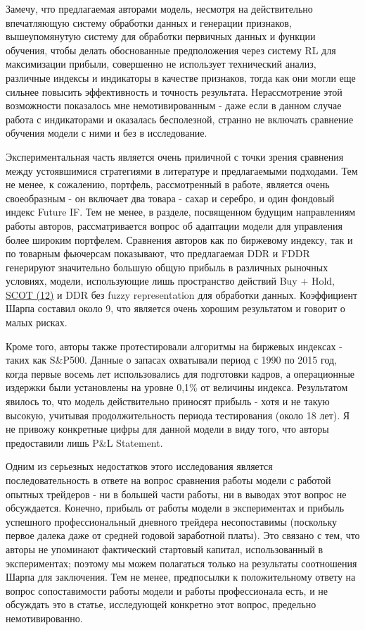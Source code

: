 \documentclass[a4paper,14pt]{extarticle}
\newcommand{\bibref}[3]{\hyperlink{#1}{#2 (#3)}} %
\begin{document}
Замечу, что предлагаемая авторами модель, несмотря на действительно впечатляющую систему обработки данных и генерации признаков, вышеупомянутую систему для обработки первичных данных и функции обучения, чтобы делать обоснованные предположения через систему RL для максимизации прибыли, совершенно не использует технический анализ, различные индексы и индикаторы в качестве признаков, тогда как они могли еще сильнее повысить эффективность и точность результата. Нерассмотрение этой возможности показалось мне немотивированным - даже если в данном случае работа с индикаторами и оказалась бесполезной, странно не включать сравнение обучения модели с ними и без в исследование.

Экспериментальная часть является очень приличной с точки зрения сравнения между устоявшимися стратегиями в литературе и предлагаемыми подходами. Тем не менее, к сожалению, портфель, рассмотренный в работе, является очень своеобразным - он включает два товара - сахар и серебро, и один фондовый индекс Future IF. Тем не менее, в разделе, посвященном будущим направлениям работы авторов, рассматривается вопрос об адаптации модели для управления более широким портфелем. Сравнения авторов как по биржевому индексу, так и по товарным фьючерсам показывают, что предлагаемая DDR и FDDR генерируют значительно большую общую прибыль в различных рыночных условиях, модели, использующие лишь пространство действий Buy + Hold, \bibref{12}{SCOT}{12} и DDR без fuzzy representation для обработки данных. Коэффициент Шарпа составил около 9, что является очень хорошим результатом и говорит о малых рисках.

Кроме того, авторы также протестировали алгоритмы на биржевых индексах - таких как S\&P500. Данные о запасах охватывали период с 1990 по 2015 год, когда первые восемь лет использовались для подготовки кадров, а операционные издержки были установлены на уровне 0,1\% от величины индекса. Результатом явилось то, что модель действительно приносят прибыль - хотя и не такую высокую, учитывая продолжительность периода тестирования (около 18 лет). Я не привожу конкретные цифры для данной модели в виду того, что авторы предоставили лишь P\&L Statement.

Одним из серьезных недостатков этого исследования является последовательность в ответе на вопрос сравнения работы модели с работой опытных трейдеров - ни в большей части работы, ни в выводах этот вопрос не обсуждается. Конечно, прибыль от работы модели в экспериментах и прибыль успешного профессиональный дневного трейдера несопоставимы (поскольку первое далека даже от средней годовой заработной платы). Это связано с тем, что авторы не упоминают фактический стартовый капитал, использованный в экспериментах; поэтому мы можем полагаться только на результаты соотношения Шарпа для заключения. Тем не менее, предпосылки к положительному ответу на вопрос сопоставимости работы модели и работы профессионала есть, и не обсуждать это в статье, исследующей конкретно этот вопрос, предельно немотивированно.
\end{document}
